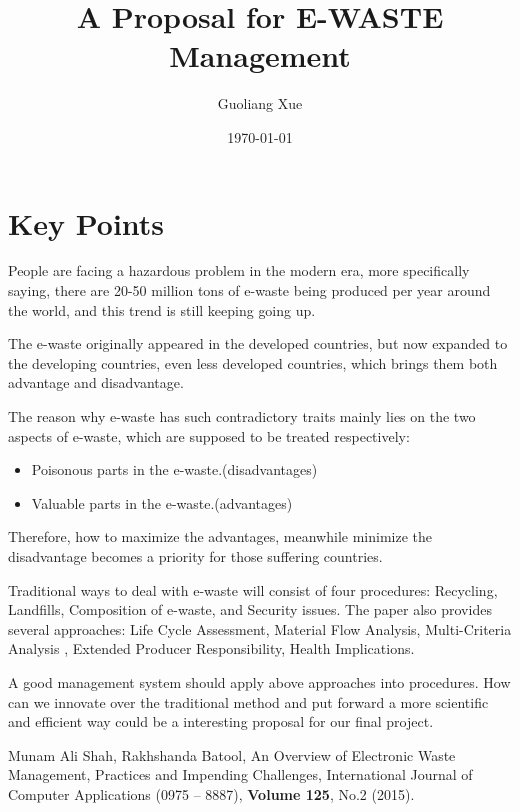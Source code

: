 \documentclass[dvips,12pt]{article}
\begin{document}
	
	\title{A Proposal for E-WASTE Management}
	\author{Guoliang Xue}
	\date{\today}
	\maketitle
	
	\section*{Key Points}
	
	People are facing a hazardous problem in the modern era, more specifically saying, there are 20-50 million tons of e-waste being produced per year around the world, and this trend is still keeping going up. 
	
	The e-waste originally appeared in the developed countries, but now expanded to the developing countries, even less developed countries, which brings them both advantage and disadvantage.
	
	The reason why e-waste has such contradictory traits mainly lies on the two aspects of e-waste, which are supposed to be treated respectively:
	\begin{itemize}
		\item Poisonous parts in the e-waste.(disadvantages)
		\item Valuable parts in the e-waste.(advantages)
	\end{itemize}
   Therefore, how to maximize the advantages, meanwhile minimize the disadvantage becomes a priority for those suffering countries.
   
   Traditional ways to deal with e-waste will consist of four procedures: Recycling, Landfills, Composition of e-waste, and Security issues.
   The paper also provides several approaches: Life Cycle Assessment, Material Flow Analysis, Multi-Criteria Analysis , Extended Producer Responsibility, Health Implications.
   
   A good management system should apply above approaches into procedures. How can we innovate over the traditional method and put forward a more scientific and efficient way could be a interesting proposal for our final project.
   
   
   
   \begin{thebibliography}{99}
   	
   	Munam Ali Shah,	
   	Rakhshanda Batool,	
   	{An Overview of Electronic Waste Management, Practices and Impending Challenges},
   	International Journal of Computer Applications (0975 – 8887), {\bf Volume 125}, No.2 (2015).
   	
   \end{thebibliography}
   
	
\end{document}
